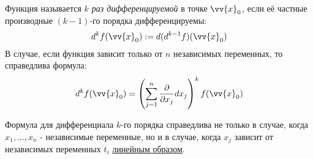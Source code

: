 \begin{definition}
	Функция называется \textit{$k$ раз дифференцируемой} в точке $\vv{x}_0$, если её частные производные $(k - 1)$-го порядка дифференцируемы:
	\[
		d^k f(\vv{x}_0) := d(d^{k - 1} f)(\vv{x}_0)
	\]
	В случае, если функция зависит только от $n$ независимых переменных, то справедлива формула:
	\[
		d^k f(\vv{x}_0) = \left(\suml_{j = 1}^n \pd{}{x_j} dx_j\right)^k f(\vv{x}_0)
	\]
\end{definition}

\begin{note}
	Формула для дифференциала $k$-го порядка справедлива не только в случае, когда $x_1, \ldots, x_n$ - независимые переменные, но и в случае, когда $x_j$ зависит от независимых переменных $t_i$ \underline{линейным образом}.
\end{note}